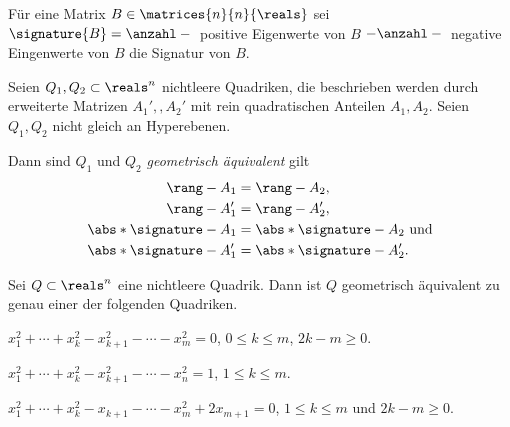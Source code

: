 Für eine Matrix \( B\in \matrices{n}{n}{\reals} \) sei \( \signature{B}=\anzahl-{} \) positive Eigenwerte von \( B \) \( -\anzahl-{} \) negative Eingenwerte von \( B \) die Signatur von \( B \).
\begin{satz}
  Seien \( Q_1,Q_2\subset \reals^n \) nichtleere Quadriken, die beschrieben werden durch erweiterte Matrizen \( A_1',,A_2' \) mit rein quadratischen Anteilen \( A_1,A_2 \). Seien \( Q_1,Q_2 \) nicht gleich an Hyperebenen.

  Dann sind \( Q_1 \) und \( Q_2 \) \emph{geometrisch äquivalent} \gdw gilt
\begin{align*}
  \rang-{A_1}&=\rang-{A_2},\\
  \rang-{A_1'}&=\rang-{A_2'},\\
  \abs*{\signature-{A_1}}&=\abs*{\signature-{A_2}}\text{ und}\\
  \abs*{\signature-{A_1'}}&=\abs*{\signature-{A_2'}}.
\end{align*}
\end{satz}
\begin{folgerung}
  Sei \( Q\subset \reals^n \) eine nichtleere Quadrik. Dann ist \( Q \) geometrisch äquivalent zu genau einer der folgenden Quadriken.
  \begin{eigenschaftenenumerate}
    \item \label{quadriken_gleich_null_nur_quadrate}\( x_1^2+\dotsb+x_k^2-x_{k+1}^2-\dotsb-x_m^2=0 \), \( 0\leq k\leq m \), \( 2k-m\geq 0 \).
    \item \label{quadriken_gleich_eins}\( x_1^2+\dotsb+x_k^2-x_{k+1}^2-\dotsb-x_n^2=1 \), \( 1\leq k\leq m \).
    \item \label{qadriken_gleich_null_plus_ein_linearer}\( x_1^2+\dotsb+x_k^2-x_{k+1}-\dotsb-x_m^2+2x_{m+1}=0 \), \( 1\leq k\leq m \) und \( 2k-m\geq 0 \).
  \end{eigenschaftenenumerate}
\end{folgerung}
